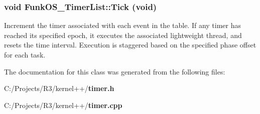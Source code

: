 \subsubsection[{Tick}]{\setlength{\rightskip}{0pt plus 5cm}void FunkOS\_\-TimerList::Tick (void)\hspace{0.3cm}{\ttfamily  [static]}}\label{class_funk_o_s___timer_list_a9da21e2e651a89d02b5c6e10f94c5ead}
Increment the timer associated with each event in the table. If any timer has reached its specified epoch, it executes the associated lightweight thread, and resets the time interval. Execution is staggered based on the specified phase offset for each task. 

The documentation for this class was generated from the following files:\begin{DoxyCompactItemize}
\item 
C:/Projects/R3/kernel++/{\bf timer.h}\item 
C:/Projects/R3/kernel++/{\bf timer.cpp}\end{DoxyCompactItemize}
